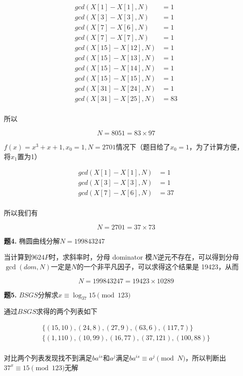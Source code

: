 \documentclass{article}
\begin{document}
\begin{equation}
  \begin{aligned}
    gcd(X[1] - X[1], N) &= 1\\
    gcd(X[3] - X[3], N)& = 1\\
    gcd(X[7] - X[6], N) &= 1\\
    gcd(X[7] - X[7], N) &= 1\\
    gcd(X[15] - X[12], N)& = 1\\
    gcd(X[15] - X[13], N)& = 1\\
    gcd(X[15] - X[14], N) &= 1\\
    gcd(X[15] - X[15], N) &= 1\\
    gcd(X[31] - X[24], N) &= 1\\
    gcd(X[31] - X[25], N) &= 83\\
  \end{aligned}
\end{equation}

所以

\begin{equation}
  N = 8051 = 83\times 97
\end{equation}

$f(x)=x^3+x+1,x_0=1,N=2701$情况下（题目给了$x_0=1$，为了计算方便，将$x_1$置为1）

\begin{equation}
  \begin{aligned}
    gcd(X[1] - X[1], N) &= 1\\
gcd(X[3] - X[3], N) &= 1\\
gcd(X[7] - X[6], N) &= 37\\
  \end{aligned}
\end{equation}

所以我们有

\begin{equation}
  N=2701=37\times73
\end{equation}

\noindent \textbf{题4.} 椭圆曲线分解$N=199843247$

当计算到$9624P$时，求斜率时，分母 dominator 模$N$逆元不存在，可以得到分母$\gcd(dom,N)$一定是$N$的一个非平凡因子，可以求得这个结果是 19423，从而

\begin{equation}
  N = 199843247 = 19423 \times 10289
\end{equation}

\noindent \textbf{题5.} $BSGS$分解求$x\equiv \log_{37}15\pmod{123}$

通过$BSGS$求得的两个列表如下

\begin{equation}
  \begin{aligned}
\{(15, 10), (24, 8), (27, 9), (63, 6), (117, 7)\}\\
    \{(1, 110), (10, 99), (16, 77), (37, 121), (100, 88)\}\\
  \end{aligned}
\end{equation}

对比两个列表发现找不到满足$ba^{is}$和$a^j$满足$ba^{is}\equiv a^j\pmod{N}$，所以判断出$37^{x}\equiv 15\pmod{123}$无解
\end{document}
